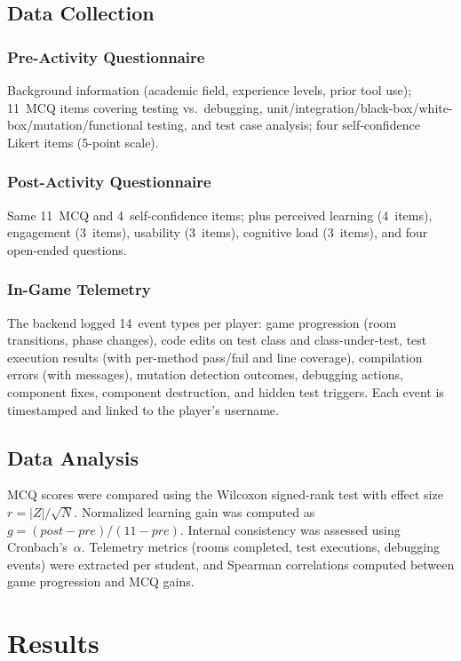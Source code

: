 \documentclass[conference]{IEEEtran}
\begin{document}
\subsection{Data Collection}

\subsubsection{Pre-Activity Questionnaire}
Background information (academic field, experience levels, prior tool use); 11~MCQ items covering testing vs.\ debugging, unit/integration/black-box/white-box/mutation/functional testing, and test case analysis; four self-confidence Likert items (5-point scale).

\subsubsection{Post-Activity Questionnaire}
Same 11~MCQ and 4~self-confidence items; plus perceived learning (4~items), engagement (3~items), usability (3~items), cognitive load (3~items), and four open-ended questions.

\subsubsection{In-Game Telemetry}
The backend logged 14~event types per player: game progression (room transitions, phase changes), code edits on test class and class-under-test, test execution results (with per-method pass/fail and line coverage), compilation errors (with messages), mutation detection outcomes, debugging actions, component fixes, component destruction, and hidden test triggers.
Each event is timestamped and linked to the player's username.

\subsection{Data Analysis}

MCQ scores were compared using the Wilcoxon signed-rank test with effect size $r = |Z|/\sqrt{N}$.
Normalized learning gain was computed as $g = (post - pre)/(11 - pre)$.
Internal consistency was assessed using Cronbach's~$\alpha$.
Telemetry metrics (rooms completed, test executions, debugging events) were extracted per student, and Spearman correlations computed between game progression and MCQ gains.

\section{Results}
\label{sec:results}
\end{document}
